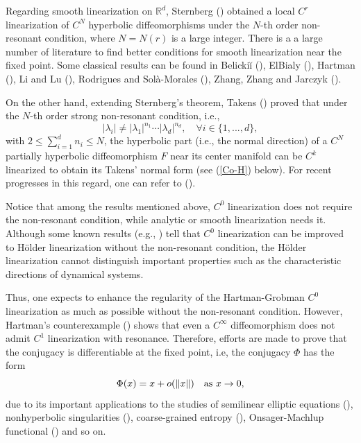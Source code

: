 \documentclass[reqno]{amsart}
\numberwithin{equation}{section}
\begin{document}
Regarding smooth linearization on $\mathbb{R}^d$,
Sternberg (\cite{Sternberg1,Sternberg2}) obtained a local $C^r$ linearization of $C^N$ hyperbolic diffeomorphisms under the $N$-th order non-resonant condition, where $N = N(r)$ is a  large integer.
There is a a large number of literature to find better conditions for smooth linearization near the fixed point.
Some classical results can be found in Belicki\u{i} (\cite{Bel-78}),
ElBialy (\cite{ElB-01}),
 Hartman (\cite{Har-60}),
   Li and Lu (\cite{LL-CPAM}),
Rodrigues and Sol\`{a}-Morales (\cite{RS-JDDE}),
  Zhang, Zhang and Jarczyk (\cite{ZZJ-MA}).

On the other hand, extending Sternberg's theorem, Takens (\cite{T-Top}) proved that under the $N$-th order strong non-resonant condition, i.e.,
$$
|\lambda_i|\ne |\lambda_1|^{n_1}\cdots |\lambda_d|^{n_d}, \quad \forall i\in \{1,...,d\},
$$
with $2\le \sum_{i=1}^d n_i\le N$,
the hyperbolic part (i.e., the normal direction) of a $C^N$ partially hyperbolic diffeomorphism $F$ near its center manifold can be $C^k$ linearized to obtain its Takens' normal form (see (\ref{Co-H}) below).
For recent progresses in this regard, one can refer to  (\cite{DTZ-SCM,LL-DCDSB16}).


Notice that among the results mentioned above, $C^0$ linearization does not require the non-resonant condition, while analytic or smooth linearization needs it. Although some known results (e.g., \cite{Ray-JDE,TB-JDE}) tell that $C^0$ linearization can be improved to H\"older linearization without the non-resonant condition, the H\"older linearization cannot distinguish important properties such as the characteristic directions of dynamical systems.

Thus, one expects to enhance the regularity of the Hartman-Grobman  $C^0$ linearization as much as possible without the non-resonant condition. However, Hartman's counterexample (\cite{Har-60}) shows that even a $C^\infty$ diffeomorphism does not admit $C^1$ linearization with resonance. Therefore, efforts are made to prove that the conjugacy is differentiable at the fixed point, i.e, the conjugacy $\Phi$ has the form
$$
\Phi(x)=x+o(\|x\|)\quad {\rm as}~x\to 0,
$$
due to its important applications to the studies of semilinear elliptic equations (\cite[pp. 342]{GGS-BOOK}), nonhyperbolic singularities (\cite{BDS-ETDS}), coarse-grained entropy (\cite{PT-10}), Onsager-Machlup functional (\cite{DLLR-SCM}) and so on.
\end{document}
